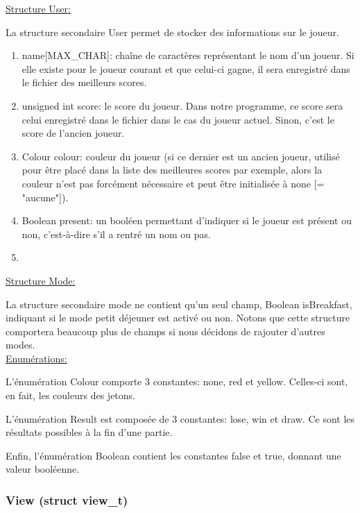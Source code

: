 \documentclass[a4paper, 11pt, oneside]{article}
\begin{document}
\hspace{5mm}
\underline{Structure User:}

La structure secondaire User permet de stocker des informations sur le joueur.
\begin{enumerate}

    \item name[MAX\_CHAR]: chaîne de caractères représentant le nom d'un joueur. Si elle existe pour le joueur courant et que celui-ci gagne, il sera enregistré dans le fichier des meilleurs scores. 
    \item unsigned int score: le score du joueur. Dans notre programme, ce score sera celui enregistré dans le fichier dans le cas du joueur actuel. Sinon, c'est le score de l'ancien joueur.
    \item Colour colour: couleur du joueur (si ce dernier est un ancien joueur, utilisé pour être placé dans la liste des meilleures scores par exemple, alors la couleur n'est pas forcément nécessaire et peut être initialisée à none [= "aucune"]). 
    \item Boolean present: un booléen permettant d'indiquer si le joueur est présent ou non, c'est-à-dire s'il a rentré un nom ou pas.
    \item []

\end{enumerate}

\hspace{5mm} 
\underline{Structure Mode:}


La structure secondaire mode ne contient qu'un seul champ, Boolean isBreakfast, indiquant si le mode petit déjeuner est activé ou non. Notons que cette structure comportera beaucoup plus de champs si nous décidons de rajouter d'autres modes. \\

\hspace{5mm}
\underline{Enumérations:}


L'énumération Colour comporte 3 constantes: none, red et yellow. Celles-ci sont, en fait, les couleurs des jetons.

L'énumération Result est composée de 3 constantes: lose, win et draw. Ce sont les résultats possibles à la fin d'une partie.

Enfin, l'énumération Boolean contient les constantes false et true, donnant une valeur booléenne.

\subsubsection{View (struct view\_t)}
\end{document}
